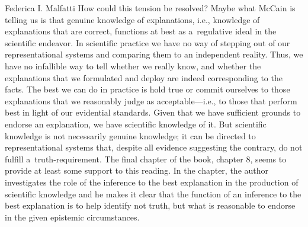 \begin{recengenv}{Federica I. Malfatti}
How could this tension be resolved? Maybe what McCain is telling us is that genuine knowledge of explanations, i.e., knowledge of explanations that are correct, functions at best as a~regulative ideal in the scientific endeavor. In scientific practice we have no way of stepping out of our representational systems and comparing them to an independent reality. Thus, we have no infallible way to tell whether we really know, and whether the explanations that we formulated and deploy are indeed corresponding to the facts. The best we can do in practice is hold true or commit ourselves to those explanations that we reasonably judge as acceptable---i.e., to those that perform best in light of our evidential standards. Given that we have sufficient grounds to endorse an explanation, we have scientific knowledge of it. But scientific knowledge is not necessarily genuine knowledge; it can be directed to representational systems that, despite all evidence suggesting the contrary, do not fulfill a~truth-requirement. The final chapter of the book, chapter 8, seems to provide at least some support to this reading. In the chapter, the author investigates the role of the inference to the best explanation in the production of scientific knowledge and he makes it clear that the function of an inference to the best explanation is to help identify not truth, but what is reasonable to endorse in the given epistemic circumstances.


\end{recengenv}
